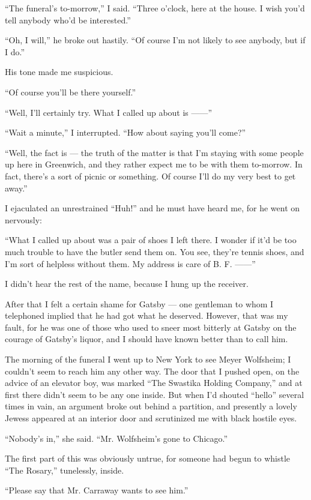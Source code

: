 \documentclass{znotebook}
\begin{document}
``The funeral’s to-morrow,'' I said. ``Three o’clock, here at the house. I wish you’d tell anybody who’d be interested.''

``Oh, I will,'' he broke out hastily. ``Of course I’m not likely to see anybody, but if I do.''

His tone made me suspicious.

``Of course you’ll be there yourself.''

``Well, I’ll certainly try. What I called up about is ——''

``Wait a minute,'' I interrupted. ``How about saying you’ll come?''

``Well, the fact is — the truth of the matter is that I’m staying with some people up here in Greenwich, and they rather expect me to be with them to-morrow. In fact, there’s a sort of picnic or something. Of course I’ll do my very best to get away.''

I ejaculated an unrestrained ``Huh!'' and he must have heard me, for he went on nervously:

``What I called up about was a pair of shoes I left there. I wonder if it’d be too much trouble to have the butler send them on. You see, they’re tennis shoes, and I’m sort of helpless without them. My address is care of B. F. ——''

I didn’t hear the rest of the name, because I hung up the receiver.

After that I felt a certain shame for Gatsby — one gentleman to whom I telephoned implied that he had got what he deserved. However, that was my fault, for he was one of those who used to sneer most bitterly at Gatsby on the courage of Gatsby’s liquor, and I should have known better than to call him.

The morning of the funeral I went up to New York to see Meyer Wolfsheim; I couldn’t seem to reach him any other way. The door that I pushed open, on the advice of an elevator boy, was marked ``The Swastika Holding Company,'' and at first there didn’t seem to be any one inside. But when I’d shouted ``hello'' several times in vain, an argument broke out behind a partition, and presently a lovely Jewess appeared at an interior door and scrutinized me with black hostile eyes.

``Nobody’s in,'' she said. ``Mr. Wolfsheim’s gone to Chicago.''

The first part of this was obviously untrue, for someone had begun to whistle ``The Rosary,'' tunelessly, inside.

``Please say that Mr. Carraway wants to see him.''
\end{document}
